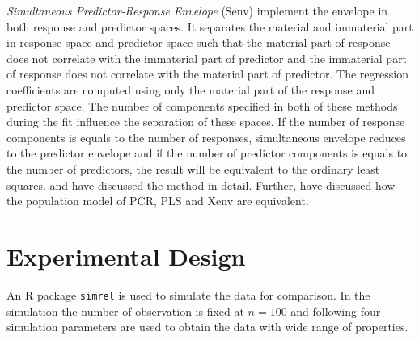 \documentclass[12pt,3p,authoryear]{elsarticle}
\begin{document}
\emph{Simultaneous Predictor-Response Envelope} (Senv) implement the envelope in both response and predictor spaces. It separates the material and immaterial part in response space and predictor space such that the material part of response does not correlate with the immaterial part of predictor and the immaterial part of response does not correlate with the material part of predictor. The regression coefficients are computed using only the material part of the response and predictor space. The number of components specified in both of these methods during the fit influence the separation of these spaces. If the number of response components is equals to the number of responses, simultaneous envelope reduces to the predictor envelope and if the number of predictor components is equals to the number of predictors, the result will be equivalent to the ordinary least squares. \citet{cook2015simultaneous} and \citet{cook2018envelope} have discussed the method in detail. Further, \citet{helland2016algorithms} have discussed how the population model of PCR, PLS and Xenv are equivalent.

\hypertarget{experimental-design}{%
\section{Experimental Design}\label{experimental-design}}

An R \citep{coreR2018} package \texttt{simrel} \citep{Rimal2018, saebo2015simrel} is used to simulate the data for comparison. In the simulation the number of observation is fixed at \(n = 100\) and following four simulation parameters are used to obtain the data with wide range of properties.
\end{document}
